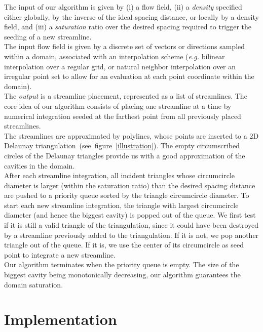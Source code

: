 The input of our algorithm is given by (i) a flow field, (ii) a
\textit{density} specified either globally, by the inverse of the
ideal spacing distance, or locally by a density field, and (iii) a
\textit{saturation} ratio over the desired spacing required to trigger
the seeding of a new streamline.\\


The input flow field is given by a discrete set of vectors or
directions sampled within a domain, associated with an interpolation
scheme (\textit{e.g.} bilinear interpolation over a regular grid, or
natural neighbor interpolation over an irregular point set to allow
for an evaluation at each point coordinate within the domain).\\

The \textit{output} is a streamline placement, represented as a list
of streamlines.  The core idea of our algorithm consists of placing
one streamline at a time by numerical integration seeded at the
farthest point from all previously placed streamlines.\\


The streamlines are approximated by polylines, whose points are
inserted to a 2D Delaunay
triangulation~(see~figure~\ref{illustration}). The empty circumscribed
circles of the Delaunay triangles provide us with a good approximation
of the cavities in the domain.\\

After each streamline integration, all incident triangles whose
circumcircle diameter is larger (within the saturation ratio) than the
desired spacing distance are pushed to a priority queue sorted by the
triangle circumcircle diameter. To start each new streamline
integration, the triangle with largest circumcircle diameter (and
hence the biggest cavity) is popped out of the queue. We first test if
it is still a valid triangle of the triangulation, since it could have
been destroyed by a streamline previously added to the
triangulation. If it is not, we pop another triangle out of the
queue. If it is, we use the center of its circumcircle as seed point
to integrate a new streamline.\\

Our algorithm terminates when the priority queue is empty. The size of
the biggest cavity being monotonically decreasing, our algorithm
guarantees the domain saturation.

\section{Implementation}
\label{Section_2D_Streamlines_Implementation}

